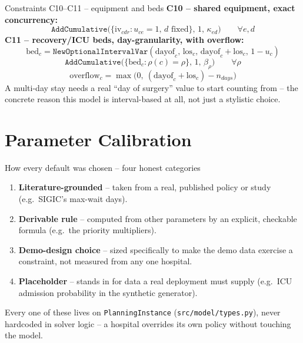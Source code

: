 \documentclass[aspectratio=169]{beamer}
\newcommand{\backbutton}{%
  \hfill\hyperlink{toc}{\beamerreturnbutton{Agenda}}%
}
\begin{document}
\begin{frame}{Constraints C10--C11 -- equipment and beds}
  \textbf{C10 -- shared equipment, exact concurrency:}
  \[
    \texttt{AddCumulative}\big(\{\text{iv}_{cdr}: u_{ce}=1,\,d\text{ fixed}\},\,1,\,\kappa_{ed}\big) \qquad \forall e,d
  \]
  \textbf{C11 -- recovery/ICU beds, day-granularity, with overflow:}
  \[
    \text{bed}_c = \texttt{NewOptionalIntervalVar}(\text{dayof}_c,\,\text{los}_c,\,\text{dayof}_c+\text{los}_c,\,1-u_c)
  \]
  \[
    \texttt{AddCumulative}\big(\{\text{bed}_c:\rho(c)=\rho\},\,1,\,\beta_\rho\big) \qquad \forall\rho
  \]
  \[
    \text{overflow}_c = \max\big(0,\ (\text{dayof}_c+\text{los}_c)-n_{days}\big)
  \]
  \footnotesize A multi-day stay needs a real ``day of surgery'' value to
  start counting from -- the concrete reason this model is interval-based
  at all, not just a stylistic choice.
  \backbutton
\end{frame}

\section{Parameter Calibration}

\begin{frame}{How every default was chosen -- four honest categories}
  \begin{enumerate}
    \item \textbf{Literature-grounded} -- taken from a real, published
      policy or study (e.g.\ SIGIC's max-wait days).
    \item \textbf{Derivable rule} -- computed from other parameters by an
      explicit, checkable formula (e.g.\ the priority multipliers).
    \item \textbf{Demo-design choice} -- sized specifically to make the
      demo data exercise a constraint, not measured from any one hospital.
    \item \textbf{Placeholder} -- stands in for data a real deployment must
      supply (e.g.\ ICU admission probability in the synthetic generator).
  \end{enumerate}
  \pause
  \footnotesize Every one of these lives on \texttt{PlanningInstance}
  (\texttt{src/model/types.py}), never hardcoded in solver logic -- a
  hospital overrides its own policy without touching the model.
\end{frame}
\end{document}
